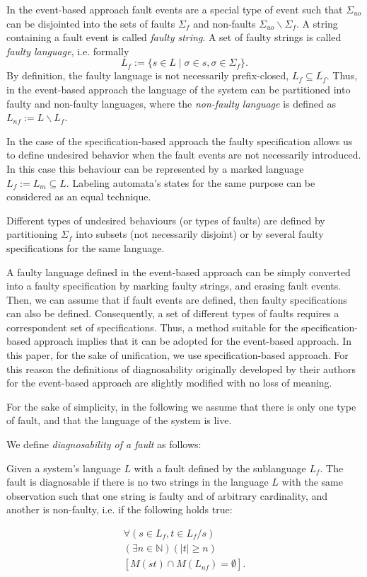 \documentclass[letterpaper, 10pt, conference]{ieeeconf}
\begin{document}
In the event-based approach fault events are a special type of event such that
$\Sigma_{uo}$ can be disjointed into the sets of faults $\Sigma_f$ and
non-faults $\Sigma_{uo}\backslash \Sigma_f$. A string containing a fault event
is called \emph{faulty string}. A set of faulty strings is called \emph{faulty
language}, i.e. formally 
$$L_f := \{ s \in L \mid \sigma \in s, \sigma \in \Sigma_f\}.$$ 
By definition, the faulty language is not necessarily prefix-closed,
$L_f \subseteq \overline{L_f}$. Thus, in the event-based approach the language
of the system can be partitioned into faulty and non-faulty languages, where the
\emph{non-faulty language} is defined as $L_{nf} := L \backslash L_f$.

In the case of the specification-based approach the faulty specification allows
us to define undesired behavior when the fault events are not necessarily
introduced. In this case this behaviour can be represented by a marked
language $L_f := L_m \subseteq L$. Labeling automata's states for the same
purpose can be considered as an equal technique.

Different types of undesired behaviours (or types of faults) are defined by
partitioning $\Sigma_f$ into subsets (not necessarily disjoint) or by several
faulty specifications for the same language. 

A faulty language defined in the event-based approach can be simply converted
into a faulty specification by marking faulty strings, and erasing fault events.
Then, we can assume that if fault events are defined, then faulty specifications
can also be defined. Consequently, a set of different types of faults requires a
correspondent set of specifications.
Thus, a method suitable for the specification-based approach implies that it can
be adopted for the event-based approach. In this paper, for the sake of
unification, we use specification-based approach. For this reason the
definitions of diagnosability originally developed by their authors for the
event-based approach are slightly modified with no loss of meaning.

For the sake of simplicity, in the following we assume that there is only one
type of fault, and that the language of the system is live.

We define \emph{diagnosability of a fault} as follows:
\begin{definition} 
\label{def:fault_is_diag}
Given a system's language $L$ with a fault defined by the sublanguage $L_f$. The
fault is diagnosable if there is no two strings in the language $L$ with the
same observation such that one string is faulty and of arbitrary cardinality,
and another is non-faulty, i.e. if the following holds true:
\end{definition}
\begin{equation}
\begin{array}{l}
	\forall(s \in L_f, t \in L_f/s) 
	\\
	(\exists n \in \mathbb{N})
	(|t| \geq n) 
	\\
	\left[ M(st) \cap M(L_{nf}) = \emptyset \right].
\end{array}
\end{equation}
\end{document}
